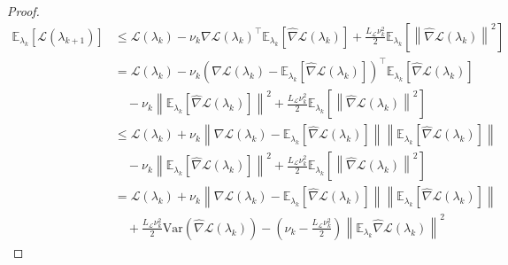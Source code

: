 \documentclass[11pt, twoside]{report}
\begin{document}
\begin{proof}
\begin{align*}
\mathbb{E}_{\lambda_k}\left[\mathcal{L}(\lambda_{k+1})\right] &\leq \mathcal{L}(\lambda_k) -\nu_k \nabla \mathcal{L}(\lambda_k)^\top \mathbb{E}_{\lambda_k}\left[\widehat{\nabla}\mathcal{L}(\lambda_k)\right] + \frac{L_{\mathcal{L}}\nu_k^2 }{2}\mathbb{E}_{\lambda_k}\left[\left\|\widehat{\nabla}\mathcal{L}(\lambda_k)\right\|^2\right] \\
&= \mathcal{L}(\lambda_k) 
- \nu_k \left( \nabla \mathcal{L}(\lambda_k) 
    - \mathbb{E}_{\lambda_k}\left[ \widehat{\nabla} \mathcal{L}(\lambda_k) \right] \right)^\top 
    \mathbb{E}_{\lambda_k}\left[ \widehat{\nabla} \mathcal{L}(\lambda_k) \right] \\
&\quad 
- \nu_k \left\| \mathbb{E}_{\lambda_k} \left[ \widehat{\nabla} \mathcal{L}(\lambda_k) \right] \right\|^2 
+ \frac{L_{\mathcal{L}} \nu_k^2}{2} 
    \mathbb{E}_{\lambda_k} \left[ \left\| \widehat{\nabla} \mathcal{L}(\lambda_k) \right\|^2 \right] \\
&\leq \mathcal{L}(\lambda_k) 
+ \nu_k \left\| \nabla \mathcal{L}(\lambda_k) 
    - \mathbb{E}_{\lambda_k} \left[ \widehat{\nabla} \mathcal{L}(\lambda_k) \right] \right\| 
    \left\| \mathbb{E}_{\lambda_k} \left[ \widehat{\nabla} \mathcal{L}(\lambda_k) \right] \right\| \\
&\quad 
- \nu_k \left\| \mathbb{E}_{\lambda_k} \left[ \widehat{\nabla} \mathcal{L}(\lambda_k) \right] \right\|^2 
+ \frac{L_{\mathcal{L}} \nu_k^2}{2} 
  \mathbb{E}_{\lambda_k} \left[ \left\| \widehat{\nabla} \mathcal{L}(\lambda_k) \right\|^2 \right]\\
  &= \mathcal{L}(\lambda_k) 
+ \nu_k \left\| \nabla \mathcal{L}(\lambda_k) 
  - \mathbb{E}_{\lambda_k} \left[ \widehat{\nabla} \mathcal{L}(\lambda_k) \right] \right\| 
  \left\| \mathbb{E}_{\lambda_k} \left[ \widehat{\nabla} \mathcal{L}(\lambda_k) \right] \right\| \\
&\quad 
+ \frac{L_{\mathcal{L}} \nu_k^2}{2} 
  \mathrm{Var} \left( \widehat{\nabla} \mathcal{L}(\lambda_k) \right) 
- \left( \nu_k 
  - \frac{L_{\mathcal{L}} \nu_k^2}{2} \right) 
  \left\| \mathbb{E}_{\lambda_k} \widehat{\nabla} \mathcal{L}(\lambda_k) \right\|^2
\end{align*}




\end{proof}
\end{document}
